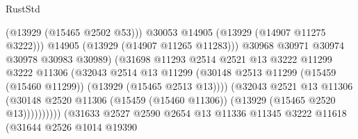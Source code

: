 \begin{lexlean}{RustStd}
\begin{coremodule}
                                                (@13929 (@15465 @2502 @53)))
                                              @30053
                                              @14905
                                              (@13929 (@14907 @11275 @3222)))
                                            @14905
                                            (@13929 (@14907 @11265 @11283)))
                                          @30968
                                          @30971
                                          @30974
                                          @30978
                                          @30983
                                          @30989)
                                        (@31698
                                          @11293
                                          @2514
                                          @2521
                                          @13
                                          @3222
                                          @11299
                                          @3222
                                          @11306
                                          (@32043
                                            @2514
                                            @13
                                            @11299
                                            (@30148
                                              @2513
                                              @11299
                                              (@15459 (@15460 @11299))
                                              (@13929 (@15465 @2513 @13))))
                                          (@32043
                                            @2521
                                            @13
                                            @11306
                                            (@30148
                                              @2520
                                              @11306
                                              (@15459 (@15460 @11306))
                                              (@13929 (@15465 @2520 @13))))))))))
                              (@31633
                                @2527
                                @2590
                                @2654
                                @13
                                @11336
                                @11345
                                @3222
                                @11618
                                (@31644
                                  @2526
                                  @1014
                                  @19390

\end{coremodule}
\end{lexlean}
